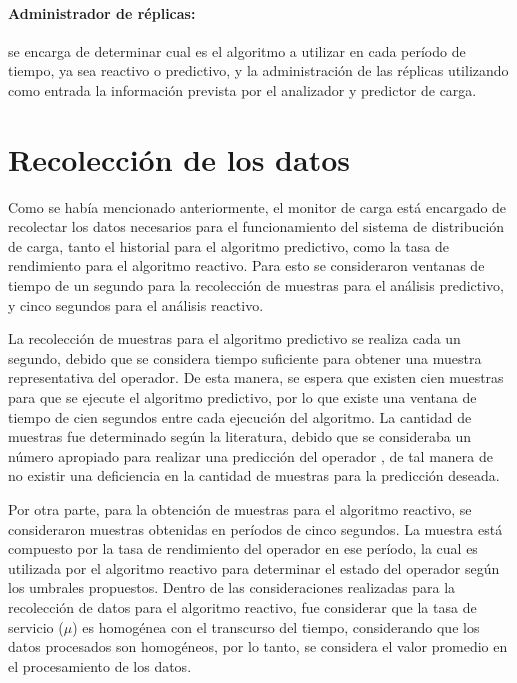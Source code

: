 \paragraph{Administrador de réplicas:} se encarga de determinar cual es el algoritmo a utilizar en cada período de tiempo, ya sea reactivo o predictivo, y la administración de las réplicas utilizando como entrada la información prevista por el analizador y predictor de carga.

\section{Recolección de los datos}

Como se había mencionado anteriormente, el monitor de carga está encargado de recolectar los datos necesarios para el funcionamiento del sistema de distribución de carga, tanto el historial para el algoritmo predictivo, como la tasa de rendimiento para el algoritmo reactivo. Para esto se consideraron ventanas de tiempo de un segundo para la recolección de muestras para el análisis predictivo, y cinco segundos para el análisis reactivo.

La recolección de muestras para el algoritmo predictivo se realiza cada un segundo, debido que se considera tiempo suficiente para obtener una muestra representativa del operador. De esta manera, se espera que existen cien muestras para que se ejecute el algoritmo predictivo, por lo que existe una ventana de tiempo de cien segundos entre cada ejecución del algoritmo. La cantidad de muestras fue determinado según la literatura, debido que se consideraba un número apropiado para realizar una predicción del operador \citep{ching2006markov}, de tal manera de no existir una deficiencia en la cantidad de muestras para la predicción deseada.

Por otra parte, para la obtención de muestras para el algoritmo reactivo, se consideraron muestras obtenidas en períodos de cinco segundos. La muestra está compuesto por la tasa de rendimiento del operador en ese período, la cual es utilizada por el algoritmo reactivo para determinar el estado del operador según los umbrales propuestos. Dentro de las consideraciones realizadas para la recolección de datos para el algoritmo reactivo, fue considerar que la tasa de servicio ($\mu$) es homogénea con el transcurso del tiempo, considerando que los datos procesados son homogéneos, por lo tanto, se considera el valor promedio en el procesamiento de los datos. 

